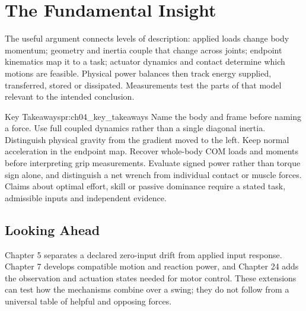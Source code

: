 \section{The Fundamental Insight}

The useful argument connects levels of description: applied loads change body momentum; geometry and inertia couple that change across joints; endpoint kinematics map it to a task; actuator dynamics and contact determine which motions are feasible. Physical power balances then track energy supplied, transferred, stored or dissipated. Measurements test the parts of that model relevant to the intended conclusion.

\begin{principle}{Key Takeaways}{pr:ch04_key_takeaways}
Name the body and frame before naming a force. Use full coupled dynamics rather than a single diagonal inertia. Distinguish physical gravity from the gradient moved to the left. Keep normal acceleration in the endpoint map. Recover whole-body COM loads and moments before interpreting grip measurements. Evaluate signed power rather than torque sign alone, and distinguish a net wrench from individual contact or muscle forces. Claims about optimal effort, skill or passive dominance require a stated task, admissible inputs and independent evidence.
\end{principle}

\subsection*{Looking Ahead}
Chapter 5 separates a declared zero-input drift from applied input response. Chapter 7 develops compatible motion and reaction power, and Chapter 24 adds the observation and actuation states needed for motor control. These extensions can test how the mechanisms combine over a swing; they do not follow from a universal table of helpful and opposing forces.



